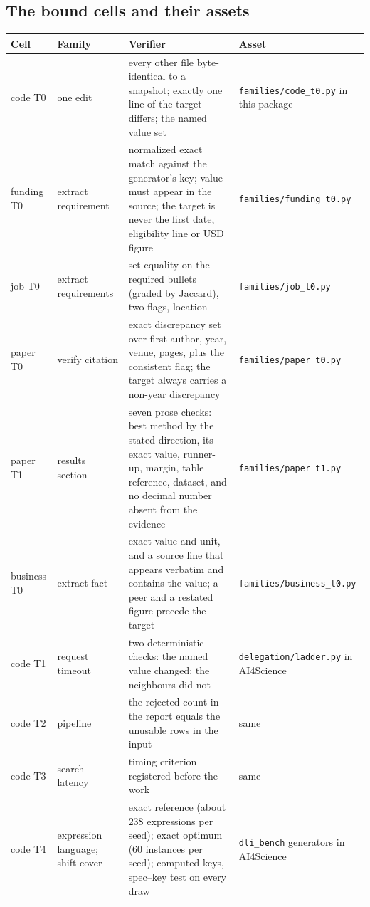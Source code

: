 \documentclass[11pt]{article}
\theoremstyle{definition}
\begin{document}
\subsection{The bound cells and their assets}

\begin{table}[H]
\centering\footnotesize
\begin{tabularx}{\textwidth}{@{}p{2.2cm}p{3.4cm}YY@{}}
\toprule
Cell & Family & Verifier & Asset \\
\midrule
code T0 & one edit & every other file byte-identical to a snapshot; exactly one line of the target differs; the named value set & \texttt{families/code\_t0.py} in this package \\
funding T0 & extract requirement & normalized exact match against the generator's key; value must appear in the source; the target is never the first date, eligibility line or USD figure & \texttt{families/funding\_t0.py} \\
job T0 & extract requirements & set equality on the required bullets (graded by Jaccard), two flags, location & \texttt{families/job\_t0.py} \\
paper T0 & verify citation & exact discrepancy set over first author, year, venue, pages, plus the consistent flag; the target always carries a non-year discrepancy & \texttt{families/paper\_t0.py} \\
paper T1 & results section & seven prose checks: best method by the stated direction, its exact value, runner-up, margin, table reference, dataset, and no decimal number absent from the evidence & \texttt{families/paper\_t1.py} \\
business T0 & extract fact & exact value and unit, and a source line that appears verbatim and contains the value; a peer and a restated figure precede the target & \texttt{families/business\_t0.py} \\
code T1 & request timeout & two deterministic checks: the named value changed; the neighbours did not & \texttt{delegation/ladder.py} in AI4Science \\
code T2 & pipeline & the rejected count in the report equals the unusable rows in the input & same \\
code T3 & search latency & timing criterion registered before the work & same \\
code T4 & expression language; shift cover & exact reference (about 238 expressions per seed); exact optimum (60 instances per seed); computed keys, spec--key test on every draw & \texttt{dli\_bench} generators in AI4Science \\

\end{tabularx}
\end{table}
\end{document}
